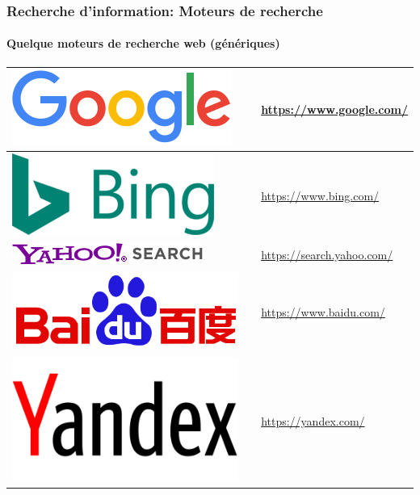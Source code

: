 \documentclass[xcolor=table]{beamer}
\begin{document}
\begin{frame}
\frametitle{Recherche d'information: Moteurs de recherche}
\framesubtitle{Quelque moteurs de recherche web (génériques)}

\def\arraystretch{0}

\begin{tabular}{L{.3\textwidth}{.8cm}cp{.6\textwidth}}%
	
	\hline
	
	\includegraphics[height=.8cm]{..//img/Bweb02-ri-gmail/google-logo.png} &
	& 
	\url{https://www.google.com/}  \\
	
	\hline
	
	\includegraphics[height=.8cm]{..//img/Bweb02-ri-gmail/bing-logo.png} &
	& 
	\url{https://www.bing.com/} \\
	
	\hline
	
	\includegraphics[height=.4cm]{..//img/Bweb02-ri-gmail/yahoo-logo.png} & 
	& 
	\url{https://search.yahoo.com/} \\
	
	\hline
	
	\includegraphics[height=.8cm]{..//img/Bweb02-ri-gmail/baidu-logo.png} & 
	& 
	\url{https://www.baidu.com/} \\
	
	\hline
	
	\includegraphics[height=.8cm]{..//img/Bweb02-ri-gmail/yandex-logo.png} & 
	& 
	\url{https://yandex.com/} \\
	
	\hline
	
\end{tabular}


\end{frame}
\end{document}
